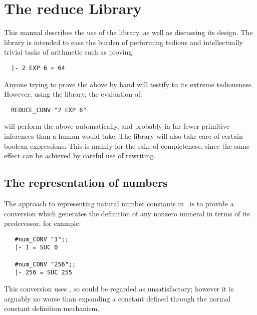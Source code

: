 \chapter{The reduce Library}

This manual describes the use of the  library, as well as discussing
its design. The library is intended to ease the burden of performing tedious
and intellectually trivial tasks of arithmetic such as proving:

\begin{hol}\begin{verbatim}
  |- 2 EXP 6 = 64
\end{verbatim}\end{hol}

\noindent Anyone trying to prove the above by hand will testify to its extreme
tediousness. However, using the  library, the evaluation of:

\begin{hol}\begin{verbatim}
  REDUCE_CONV "2 EXP 6"
\end{verbatim}\end{hol}

\noindent will perform the above automatically, and probably in far fewer
primitive inferences than a human would take. The library will also take care
of certain boolean expressions. This is mainly for the sake of completeness,
since the same effect can be achieved by careful use of rewriting.


\section{The representation of numbers}

The approach to representing natural number constants in \HOL\ is to provide a
conversion  which generates the definition of any nonzero numeral
in terms of its predecessor, for example:

\begin{hol}\begin{verbatim}
   #num_CONV "1";;
   |- 1 = SUC 0

   #num_CONV "256";;
   |- 256 = SUC 255
\end{verbatim}\end{hol}

\noindent This conversion uses , so could be regarded as
unsatisfactory; however it is arguably no worse than expanding a constant
defined through the normal constant definition mechanism.

